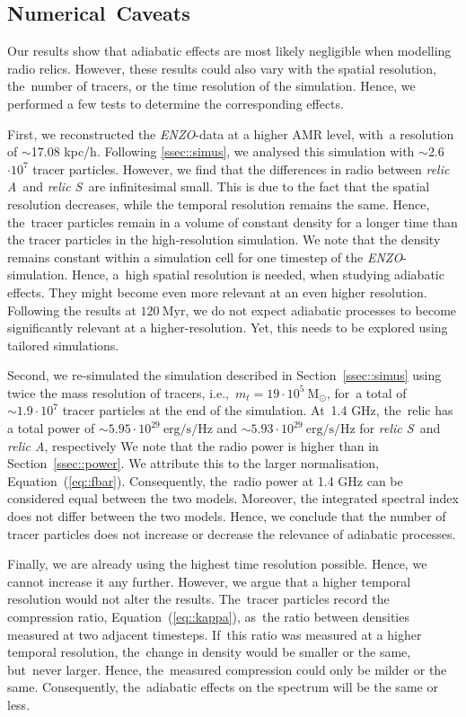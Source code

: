 \documentclass[galaxies,article,accept,moreauthors,pdftex]{mdpi}
\newcommand{\enzo}{{\it {\small ENZO}}}
\newcommand{\Msun}{\mathrm{M}_{\odot}}
\newcommand{\sek}{\mathrm{s}}
\newcommand{\Myr}{\mathrm{Myr}}
\newcommand{\erg}{\mathrm{erg}}
\newcommand{\Hz}{\mathrm{Hz}}
\newcommand{\relicA}{\textit{relic A}}
\newcommand{\relicS}{\textit{relic S}}
\begin{document}
\subsection{Numerical~Caveats}\label{ssec::caveats}

{{Our results show that adiabatic effects are most likely negligible when mo\-del\-ling radio relics. However, these results could also vary with the spatial resolution, the~number of tracers, or the time resolution of the simulation. Hence, we performed a few tests to determine the corresponding effects.}}

{{First, we reconstructed the \enzo-data at a higher AMR level, with~a resolution}} of $\sim$17.08 kpc/h. {{Following \ref{ssec::simus}, we analysed this simulation with $\sim$2.6 $\cdot 10^7$ tracer particles. However, we find that the differences in radio between \relicA \ and \relicS \ are infinitesimal small. This is due to the fact that the spatial resolution decreases, while the temporal resolution remains the same. Hence, the~tracer particles remain in a volume of constant density}}  for a longer time than the tracer particles in the high-resolution simulation. We note that the density remains constant within a simulation cell for one timestep of the \enzo-simulation. {{Hence, a~high spatial resolution is needed, when studying adia\-batic effects. They might become even more relevant at an even higher resolution. Following the results at $120 \ \Myr$, we do not expect adiabatic processes to become significantly relevant at a higher-resolution. Yet, this needs to be explored using tailored simulations. }}

{{Second, we re-simulated the simulation described in Section~\ref{ssec::simus} using twice the mass resolution of tracers, i.e.,~$m_t = 19 \cdot 10^5 \ \Msun$, for~a total of $\sim 1.9 \cdot 10^7$ tracer particles at the end of the simulation. At~1.4 GHz, the~relic has a total power of $\sim 5.95 \cdot 10^{29} \ \erg / \sek / \Hz$ and $\sim 5.93 \cdot 10^{29} \ \erg / \sek / \Hz$ for \relicS \ and \relicA, respectively}} We note that the radio power is higher than in Section~\ref{ssec::power}. We attribute this to the larger normalisation, Equation~(\ref{eq::fbar}). {{Consequently, the~radio power at 1.4 GHz can be considered equal between the two models. Moreover, the integrated spectral index does not differ between the two models. Hence, we conclude that the number of tracer particles does not increase or decrease the relevance of adiabatic processes.}}

{{Finally, we are already using the highest time resolution possible. Hence, we cannot increase it any further. However, we argue that a higher temporal resolution would not alter the results. The~tracer particles record the compression ratio, Equation~(\ref{eq::kappa}), as~the ratio between densities measured at two adjacent timesteps. If~this ratio was measured at a higher temporal resolution, the~change in density would be smaller or the same, but~never larger. Hence, the~measured compression could only be milder or the same. Consequently, the~adiabatic effects on the spectrum will be the same or less.}} 
\end{document}
